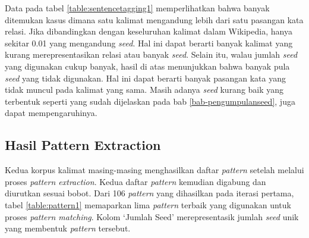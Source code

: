 \begin{table}
  \centering
  \caption{Hasil \textit{sentence tagging} dengan \textit{seed}}
  \label{table:sentencetagging1}
\end{table}

\noindent Data pada tabel \ref{table:sentencetagging1} memperlihatkan bahwa banyak ditemukan kasus dimana satu kalimat mengandung lebih dari satu pasangan kata relasi. Jika dibandingkan dengan keseluruhan kalimat dalam Wikipedia, hanya sekitar 0.01 yang mengandung \textit{seed}. Hal ini dapat berarti banyak kalimat yang kurang merepresentasikan relasi atau banyak \textit{seed}. Selain itu, walau jumlah \textit{seed} yang digunakan cukup banyak, hasil di atas menunjukkan bahwa banyak pula \textit{seed} yang tidak digunakan. Hal ini dapat berarti banyak pasangan kata yang tidak muncul pada kalimat yang sama. Masih adanya \textit{seed} kurang baik yang terbentuk seperti yang sudah dijelaskan pada bab \ref{bab-pengumpulanseed}, juga dapat mempengaruhinya.

\subsection{Hasil Pattern Extraction}
Kedua korpus kalimat masing-masing menghasilkan daftar \textit{pattern} setelah melalui proses \textit{pattern extraction}. Kedua daftar \textit{pattern} kemudian digabung dan diurutkan sesuai bobot. Dari 106 \textit{pattern} yang dihasilkan pada iterasi pertama, tabel \ref{table:pattern1} memaparkan lima \textit{pattern} terbaik yang digunakan untuk proses \textit{pattern matching}. Kolom `Jumlah Seed' merepresentasik jumlah \textit{seed} unik yang membentuk \textit{pattern} tersebut.

